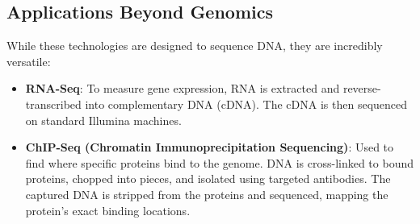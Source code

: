 \documentclass[11pt,a4paper]{article}
\begin{document}
\subsection{Applications Beyond Genomics}
While these technologies are designed to sequence DNA, they are incredibly versatile:
\begin{itemize}
    \item \textbf{RNA-Seq}: To measure gene expression, RNA is extracted and reverse-transcribed into complementary DNA (cDNA). The cDNA is then sequenced on standard Illumina machines.
    \item \textbf{ChIP-Seq (Chromatin Immunoprecipitation Sequencing)}: Used to find where specific proteins bind to the genome. DNA is cross-linked to bound proteins, chopped into pieces, and isolated using targeted antibodies. The captured DNA is stripped from the proteins and sequenced, mapping the protein's exact binding locations.
\end{itemize}
\end{document}
